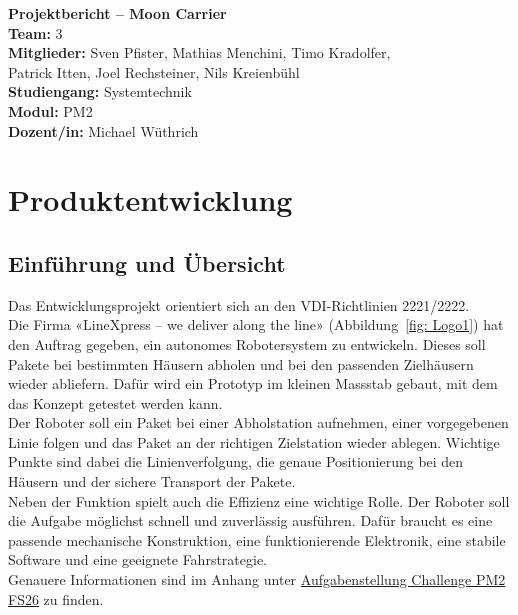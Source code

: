 \documentclass[11pt,a4paper]{article}
\begin{document}
	\begin{titlepage}
		\centering
		\vspace*{2cm}
		
		{\Large \textbf{Projektbericht -- Moon Carrier}}\\[1.5cm]
		
		\textbf{Team:} 3\\[0.3cm]
		\textbf{Mitglieder:} Sven Pfister, Mathias Menchini, Timo Kradolfer,\\
		Patrick Itten, Joel Rechsteiner, Nils Kreienbühl\\[0.3cm]
		\textbf{Studiengang:} Systemtechnik\\
		\textbf{Modul:} PM2\\
		\textbf{Dozent/in:} Michael Wüthrich\\[1cm]
		
		\vfill
	\end{titlepage}
	
	\tableofcontents
	\clearpage
	
	\section{Produktentwicklung}
	
	\subsection{Einführung und Übersicht}
	Das Entwicklungsprojekt orientiert sich an den VDI-Richtlinien 2221/2222.\\
	Die Firma «LineXpress – we deliver along the line» (Abbildung~\ref{fig: Logo1}) hat den Auftrag gegeben, ein autonomes Robotersystem zu entwickeln. Dieses soll Pakete bei bestimmten Häusern abholen und bei den passenden Zielhäusern wieder abliefern. Dafür wird ein Prototyp im kleinen Massstab gebaut, mit dem das Konzept getestet werden kann.\\
	Der Roboter soll ein Paket bei einer Abholstation aufnehmen, einer vorgegebenen Linie folgen und das Paket an der richtigen Zielstation wieder ablegen. Wichtige Punkte sind dabei die Linienverfolgung, die genaue Positionierung bei den Häusern und der sichere Transport der Pakete.\\
	Neben der Funktion spielt auch die Effizienz eine wichtige Rolle. Der Roboter soll die Aufgabe möglichst schnell und zuverlässig ausführen. Dafür braucht es eine passende mechanische Konstruktion, eine funktionierende Elektronik, eine stabile Software und eine geeignete Fahrstrategie.\\
	Genauere Informationen sind im Anhang unter \hyperref[anhang:Aufgabenstellung]{Aufgabenstellung Challenge PM2 FS26} zu finden.
	
\end{document}

